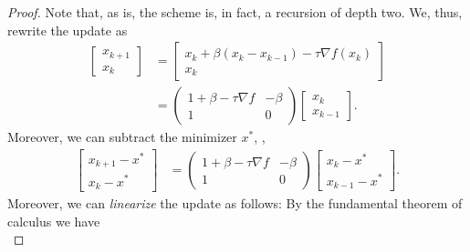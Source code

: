 \begin{proof}
    Note that, as is, the scheme is, in fact, a recursion of depth two. We, thus, rewrite the update as
    \begin{equation}
        \begin{aligned}
            \begin{bmatrix}
                x_{k+1}\\
                x_k
            \end{bmatrix}
            &= 
            \begin{bmatrix}
                x_{k} + \beta(x_{k}-x_{k-1}) - \tau\nabla f(x_k)\\
                x_k
            \end{bmatrix}\\
            &=
            \begin{pmatrix}
                1+\beta - \tau \nabla f&-\beta\\
                1&0
            \end{pmatrix}
            \begin{bmatrix}
                x_k\\
                x_{k-1}
            \end{bmatrix}.
        \end{aligned}
    \end{equation}
    Moreover, we can subtract the minimizer $x^*$, \ie, 
    \begin{equation}
        \begin{aligned}
            \begin{bmatrix}
                x_{k+1}-x^*\\
                x_k-x^*
            \end{bmatrix}
            &=
            \begin{pmatrix}
                1+\beta - \tau \nabla f&-\beta\\
                1&0
            \end{pmatrix}
            \begin{bmatrix}
                x_k-x^*\\
                x_{k-1}-x^*
            \end{bmatrix}.
        \end{aligned}
    \end{equation}
    Moreover, we can \emph{linearize} the update as follows: By the fundamental theorem of calculus we have
    \begin{equation}

\end{equation}
\end{proof}
